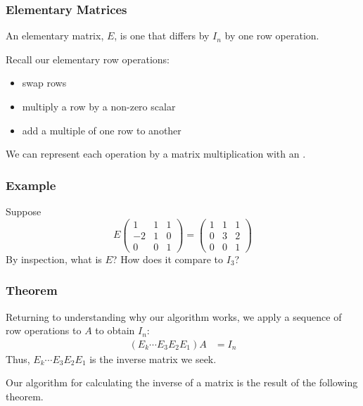 \begin{frame}
\frametitle{Elementary Matrices}

An elementary matrix, $E$, is one that differs by $I_n$ by one row operation. 

Recall our elementary row operations:  
\begin{itemize} 
    \item swap rows
    \item multiply a row by a non-zero scalar
    \item add a multiple of one row to another
\end{itemize}
We can represent each operation by a matrix multiplication with an .
\end{frame}

\begin{frame}
\frametitle{Example}
Suppose $$E \begin{pmatrix} 1&1&1\\-2&1&0\\0&0&1\end{pmatrix}= \begin{pmatrix} 1&1&1\\0&3&2\\0&0&1\end{pmatrix}$$ By inspection, what is $E$? How does it compare to $I_3$?
\end{frame}

\begin{frame}
\frametitle{Theorem}

Returning to understanding why our algorithm works, we apply a sequence of row operations to $A$ to obtain $I_n$:
\begin{align*}
    (E_k \cdots E_3E_2E_1 ) A &= I_n
\end{align*}
Thus, $E_k \cdots E_3E_2E_1 $ is the inverse matrix we seek. 

\vspace{12pt}

Our algorithm for calculating the inverse of a matrix is the result of the following theorem. 

\begin{center}\end{center}



\vspace{12pt} 



\end{frame}




